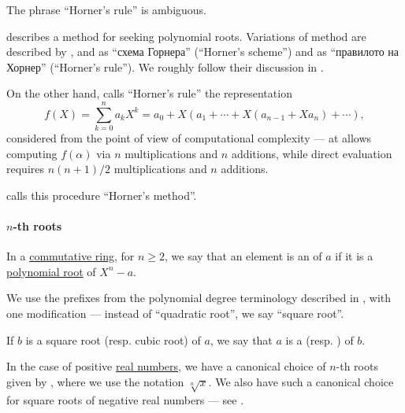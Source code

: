 \begin{remark}\label{rem:alg:horners_rule}
  The phrase \enquote{Horner's rule} is ambiguous.

   describes a method for seeking polynomial roots. Variations of method are described by ,  and  as \enquote{схема Горнера} (\enquote{Horner's scheme}) and  as \enquote{правилото на Хорнер} (\enquote{Horner's rule}). We roughly follow their discussion in .

  On the other hand,  calls \enquote{Horner's rule} the representation
  \begin{equation}\label{eq:rem:alg:horners_rule/knuth}
    f(X) = \sum_{k=0}^n a_k X^k = a_0 + X (a_1 + \cdots + X(a_{n-1} + X a_n) + \cdots),
  \end{equation}
  considered from the point of view of computational complexity --- at allows computing \( f(\alpha) \) via \( n \) multiplications and \( n \) additions, while direct evaluation requires  \( {n(n+1)} / 2 \) multiplications and \( n \) additions.

   calls this procedure \enquote{Horner's method}.
\end{remark}

\paragraph{\( n \)-th roots}

\begin{definition}\label{def:nth_root}\mimprovised
  In a \hyperref[def:ring/commutative]{commutative ring}, for \( n \geq 2 \), we say that an element is an  of \( a \) if it is a \hyperref[def:root_of_polynomial]{polynomial root} of \( X^n - a \).

  We use the prefixes from the polynomial degree terminology described in , with one modification --- instead of \enquote{quadratic root}, we say \enquote{square root}.

  If \( b \) is a square root (resp. cubic root) of \( a \), we say that \( a \) is a  (resp. ) of \( b \).
\end{definition}
\begin{comments}
  \item In the case of positive \hyperref[def:real_numbers]{real numbers}, we have a canonical choice of \( n \)-th roots given by , where we use the notation \( \sqrt[n]{ x } \). We also have such a canonical choice for square roots of negative real numbers --- see .
\end{comments}

